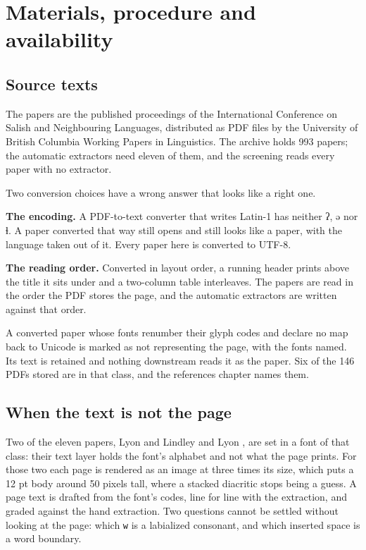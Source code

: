 \chapter{Materials, procedure and availability}

\section{Source texts}

The papers are the published proceedings of the International Conference on Salish and Neighbouring
Languages, distributed as PDF files by the University of British Columbia Working Papers in
Linguistics. The archive holds 993 papers; the automatic extractors need eleven of them, and the
screening reads every paper with no extractor.

Two conversion choices have a wrong answer that looks like a right one.

\textbf{The encoding.} A PDF-to-text converter that writes Latin-1 has neither ʔ, ə nor ɬ. A paper
converted that way still opens and still looks like a paper, with the language taken out of it.
Every paper here is converted to UTF-8.

\textbf{The reading order.} Converted in layout order, a running header prints above the title it
sits under and a two-column table interleaves. The papers are read in the order the PDF stores the
page, and the automatic extractors are written against that order.

A converted paper whose fonts renumber their glyph codes and declare no map back to Unicode is
marked as not representing the page, with the fonts named. Its text is retained and nothing downstream
reads it as the paper. Six of the 146 PDFs stored are in that class, and the references chapter
names them.

\section{When the text is not the page}

Two of the eleven papers, Lyon \cite{src:Lyon-2015} and Lindley and Lyon \cite{src:Lindley-and-Lyon-2013},
are set in a font of that class: their text layer holds the font's alphabet and not what the page
prints. For those two each page is rendered as an image at three times its size, which puts a 12 pt
body around 50 pixels tall, where a stacked diacritic stops being a guess. A page text is drafted
from the font's codes, line for line with the extraction, and graded against the hand extraction.
Two questions cannot be settled without looking at the page: which \texttt{w} is a labialized
consonant, and which inserted space is a word boundary.

